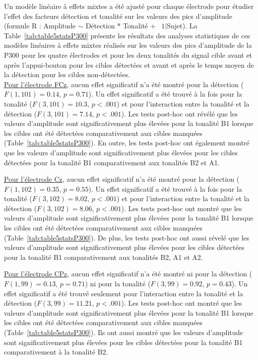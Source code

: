 Un modèle linéaire à effets mixtes a été ajusté pour chaque électrode pour étudier l'effet des facteurs détection et tonalité sur les valeurs des pics d'amplitude (formule R : Amplitude $\sim$ Détection * Tonalité + ~$1|$Sujet). 
La Table~\ref{tab:table5statsP300} présente les résultats des analyses statistiques de ces modèles linéaires à effets mixtes réalisés sur les valeurs des pics d'amplitude de la P300 pour les quatre électrodes et pour les deux tonalités du signal cible avant et après l'appui-bouton pour les cibles détectées et avant et après le temps moyen de la détection pour les cibles non-détectées. \\

\underline{Pour l'électrode FCz}, aucun effet significatif n'a été montré pour la détection ($F(1,101)=0.14$, $p=0.71$). 
Un effet significatif a été trouvé à la fois pour la tonalité ($F(3,101)=10.3$, $p<.001$) et pour l'interaction entre la tonalité et la détection ($F(3,101)=7.14$, $p<.001$). 
Les tests post-hoc ont révélé que les valeurs d'amplitude sont significativement plus élevées pour la tonalité B1 lorsque les cibles ont été détectées comparativement aux cibles manquées (Table~\ref{tab:table5statsP300}). 
En outre, les tests post-hoc ont également montré que les valeurs d'amplitude sont significativement plus élevées pour les cibles détectées pour la tonalité B1 comparativement aux tonalités B2 et A1. 

\underline{Pour l'électrode Cz}, aucun effet significatif n'a été montré pour la détection ($F(1,102)=0.35$, $p=0.55$). 
Un effet significatif a été trouvé à la fois pour la tonalité ($F(3,102)=8.02$, $p<.001$) et pour l'interaction entre la tonalité et la détection ($F(3,102)=8.06$, $p<.001$). 
Les tests post-hoc ont montré que les valeurs d'amplitude sont significativement plus élevées pour la tonalité B1 lorsque les cibles ont été détectées comparativement aux cibles manquées (Table~\ref{tab:table5statsP300}). 
De plus, les tests post-hoc ont aussi révelé que les valeurs d'amplitude sont significativement plus élevées pour les cibles détectées pour la tonalité B1 comparativement aux tonalités B2, A1 et A2. 

\underline{Pour l'électrode CPz}, aucun effet significatif n'a été montré ni pour la détection ($F(1,99)=0.13$, $p=0.71$) ni pour la tonalité ($F(3,99)=0.92$, $p=0.43$). 
Un effet significatif a été trouvé seulement pour l'interaction entre la tonalité et la détection ($F(3,99)=11.21$, $p<.001$). 
Les tests post-hoc ont montré que les valeurs d'amplitude sont significativement plus élevées pour la tonalité B1 lorsque les cibles ont été détectées comparativement aux cibles manquées (Table~\ref{tab:table5statsP300}). 
Ils ont aussi montré que les valeurs d'amplitude sont significativement plus élevées pour les cibles détectées pour la tonalité B1 comparativement à la tonalité B2. 

